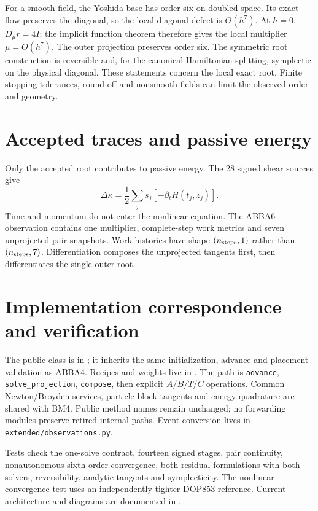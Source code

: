 \documentclass[11pt,a4paper]{article}
\begin{document}
For a smooth field, the Yoshida base has order six on doubled space. Its
exact flow preserves the diagonal, so the local diagonal defect is
$O(h^7)$. At $h=0$, $D_\mu r=4I$; the implicit function theorem therefore
gives the local multiplier $\mu=O(h^7)$. The outer projection preserves
order six. The symmetric root construction is reversible and, for the
canonical Hamiltonian splitting, symplectic on the physical diagonal.
These statements concern the local exact root. Finite stopping tolerances,
round-off and nonsmooth fields can limit the observed order and geometry.

\section{Accepted traces and passive energy}
Only the accepted root contributes to passive energy. The 28 signed shear
sources give
\[
 \Delta\kappa=\frac12\sum_j s_j[-\partial_tH(t_j,z_j)].
\]
Time and momentum do not enter the nonlinear equation. The ABBA6 observation
contains one multiplier, complete-step work metrics and seven unprojected
pair snapshots. Work histories have shape $(n_{\rm steps},1)$ rather than
$(n_{\rm steps},7)$. Differentiation composes the unprojected tangents first,
then differentiates the single outer root.

\section{Implementation correspondence and verification}
The public class is in ; it inherits the
same initialization, advance and placement validation as ABBA4. Recipes and
weights live in . The path is
\texttt{advance}, \texttt{solve\_projection}, \texttt{compose}, then
explicit $A/B/T/C$ operations. Common Newton/Broyden services,
particle-block tangents and energy quadrature are shared with BM4.
Public method names remain unchanged; no forwarding modules preserve retired
internal paths. Event conversion lives in \texttt{extended/observations.py}.

Tests check the one-solve contract, fourteen signed stages, pair continuity,
nonautonomous sixth-order convergence, both residual formulations with both
solvers, reversibility, analytic tangents and symplecticity. The nonlinear
convergence test uses an independently tighter DOP853 reference. Current
architecture and diagrams are documented in
.
\end{document}
